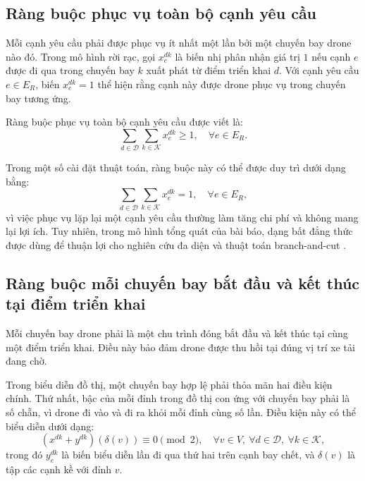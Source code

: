 \subsection{Ràng buộc phục vụ toàn bộ cạnh yêu cầu}

Mỗi cạnh yêu cầu phải được phục vụ ít nhất một lần bởi một chuyến bay drone nào đó. Trong mô hình rời rạc, gọi $x^{dk}_e$ là biến nhị phân nhận giá trị $1$ nếu cạnh $e$ được đi qua trong chuyến bay $k$ xuất phát từ điểm triển khai $d$. Với cạnh yêu cầu $e \in E_R$, biến $x^{dk}_e = 1$ thể hiện rằng cạnh này được drone phục vụ trong chuyến bay tương ứng.

Ràng buộc phục vụ toàn bộ cạnh yêu cầu được viết là:
\begin{equation}
\sum_{d \in \mathcal{D}} \sum_{k \in \mathcal{K}} x^{dk}_e \geq 1,
\quad \forall e \in E_R.
\end{equation}

Trong một số cài đặt thuật toán, ràng buộc này có thể được duy trì dưới dạng bằng:
\begin{equation}
\sum_{d \in \mathcal{D}} \sum_{k \in \mathcal{K}} x^{dk}_e = 1,
\quad \forall e \in E_R,
\end{equation}
vì việc phục vụ lặp lại một cạnh yêu cầu thường làm tăng chi phí và không mang lại lợi ích. Tuy nhiên, trong mô hình tổng quát của bài báo, dạng bất đẳng thức được dùng để thuận lợi cho nghiên cứu đa diện và thuật toán branch-and-cut \cite{corberan2025mmdlarp}.

\subsection{Ràng buộc mỗi chuyến bay bắt đầu và kết thúc tại điểm triển khai}

Mỗi chuyến bay drone phải là một chu trình đóng bắt đầu và kết thúc tại cùng một điểm triển khai. Điều này bảo đảm drone được thu hồi tại đúng vị trí xe tải đang chờ.

Trong biểu diễn đồ thị, một chuyến bay hợp lệ phải thỏa mãn hai điều kiện chính. Thứ nhất, bậc của mỗi đỉnh trong đồ thị con ứng với chuyến bay phải là số chẵn, vì drone đi vào và đi ra khỏi mỗi đỉnh cùng số lần. Điều kiện này có thể biểu diễn dưới dạng:
\begin{equation}
(x^{dk} + y^{dk})(\delta(v)) \equiv 0 \pmod{2},
\quad \forall v \in V,\ \forall d \in \mathcal{D},\ \forall k \in \mathcal{K},
\end{equation}
trong đó $y^{dk}_e$ là biến biểu diễn lần đi qua thứ hai trên cạnh bay chết, và $\delta(v)$ là tập các cạnh kề với đỉnh $v$.

